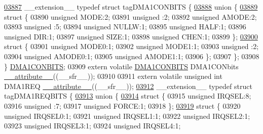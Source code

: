 \begin{DoxyCode}
\hypertarget{a00009_source_l03887}{}\hyperlink{a00008}{03887} \_\_extension\_\_ \textcolor{keyword}{typedef} \textcolor{keyword}{struct }tagDMA1CONBITS \{
\hypertarget{a00009_source_l03888}{}\hyperlink{a00009}{03888}   \textcolor{keyword}{union }\{
\hypertarget{a00009_source_l03889}{}\hyperlink{a00009}{03889}     \textcolor{keyword}{struct }\{
03890       \textcolor{keywordtype}{unsigned} MODE:2;
03891       \textcolor{keywordtype}{unsigned} :2;
03892       \textcolor{keywordtype}{unsigned} AMODE:2;
03893       \textcolor{keywordtype}{unsigned} :5;
03894       \textcolor{keywordtype}{unsigned} NULLW:1;
03895       \textcolor{keywordtype}{unsigned} HALF:1;
03896       \textcolor{keywordtype}{unsigned} DIR:1;
03897       \textcolor{keywordtype}{unsigned} SIZE:1;
03898       \textcolor{keywordtype}{unsigned} CHEN:1;
03899     \};
\hypertarget{a00009_source_l03900}{}\hyperlink{a00009}{03900}     \textcolor{keyword}{struct }\{
03901       \textcolor{keywordtype}{unsigned} MODE0:1;
03902       \textcolor{keywordtype}{unsigned} MODE1:1;
03903       \textcolor{keywordtype}{unsigned} :2;
03904       \textcolor{keywordtype}{unsigned} AMODE0:1;
03905       \textcolor{keywordtype}{unsigned} AMODE1:1;
03906     \};
03907   \};
03908 \} \hyperlink{a00008_d9/d95/a00400}{DMA1CONBITS};
03909 \textcolor{keyword}{extern} \textcolor{keyword}{volatile} \hyperlink{a00008_d9/d95/a00400}{DMA1CONBITS} DMA1CONbits \hyperlink{a00009_a493c46f03454991ccc5aa7a6e1dfb2a7}{\_\_attribute\_\_}((\_\_sfr\_\_));
03910 
03911 \textcolor{keyword}{extern} \textcolor{keyword}{volatile} \textcolor{keywordtype}{unsigned} \textcolor{keywordtype}{int}  DMA1REQ \hyperlink{a00009_a493c46f03454991ccc5aa7a6e1dfb2a7}{\_\_attribute\_\_}((\_\_sfr\_\_));
\hypertarget{a00009_source_l03912}{}\hyperlink{a00008}{03912} \_\_extension\_\_ \textcolor{keyword}{typedef} \textcolor{keyword}{struct }tagDMA1REQBITS \{
\hypertarget{a00009_source_l03913}{}\hyperlink{a00009}{03913}   \textcolor{keyword}{union }\{
\hypertarget{a00009_source_l03914}{}\hyperlink{a00009}{03914}     \textcolor{keyword}{struct }\{
03915       \textcolor{keywordtype}{unsigned} IRQSEL:8;
03916       \textcolor{keywordtype}{unsigned} :7;
03917       \textcolor{keywordtype}{unsigned} FORCE:1;
03918     \};
\hypertarget{a00009_source_l03919}{}\hyperlink{a00009}{03919}     \textcolor{keyword}{struct }\{
03920       \textcolor{keywordtype}{unsigned} IRQSEL0:1;
03921       \textcolor{keywordtype}{unsigned} IRQSEL1:1;
03922       \textcolor{keywordtype}{unsigned} IRQSEL2:1;
03923       \textcolor{keywordtype}{unsigned} IRQSEL3:1;
03924       \textcolor{keywordtype}{unsigned} IRQSEL4:1;

\end{DoxyCode}
